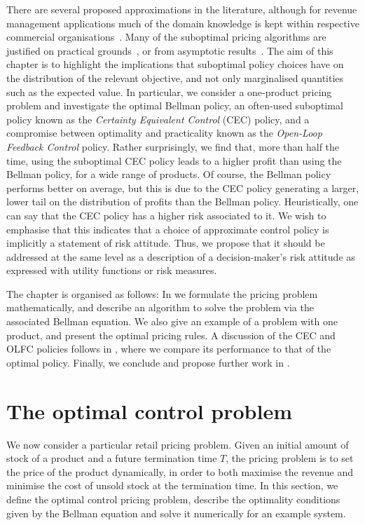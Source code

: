 \documentclass[main.tex]{subfiles}
\begin{document}
There are several proposed approximations in the
literature, although for revenue management applications much of the domain knowledge is kept within
respective commercial organisations~\citep[Ch.~9]{talluri2006theory}.
Many of the suboptimal pricing algorithms are justified on practical
grounds~\citep{aviv2012dynamic}, or
from asymptotic results~\citep{gallego1994optimal}.
The aim of this chapter is to highlight the implications that suboptimal policy
choices have on the distribution of the relevant objective, and not
only marginalised quantities such as the expected value.
In particular, we consider a one-product pricing problem and
investigate the optimal Bellman policy, an often-used suboptimal
policy known as the \emph{Certainty Equivalent Control} (CEC)
policy, and a compromise between optimality and practicality known as the
\emph{Open-Loop Feedback Control} policy.
Rather surprisingly, we find that, more than half the
time, using the suboptimal CEC policy
leads to a higher profit than using the Bellman policy, for a wide
range of products. Of course, the
Bellman policy performs better on average, but
this is due to the CEC policy generating a larger, lower tail on the
distribution of profits than the Bellman policy.
Heuristically, one can say that the CEC policy has a higher risk
associated to it. We wish to emphasise that this indicates that a
choice of approximate control policy is implicitly a statement of
risk attitude. Thus, we propose that it should be addressed at the same level as a
description of a decision-maker's risk attitude as expressed with
utility functions or risk measures.

The chapter is organised as follows:
In  we formulate the
pricing problem mathematically, and describe an algorithm to solve the
problem via the associated Bellman equation. We also give an example
of a problem with one product, and present the optimal pricing rules.
A discussion of the CEC and OLFC policies follows in
, where we compare its
performance to that of
the optimal policy.
Finally, we conclude and propose further work in .


\section{The optimal control problem}\label{sec:bellman_optimal_control}
We now consider a particular retail
pricing problem.
Given an initial amount of stock of a product and a future
termination time $T$,
the pricing problem is to
set the price
of the product dynamically, in order to both maximise the revenue and minimise the cost of
unsold stock at the termination time.
In this section, we define the optimal control pricing problem,
describe the optimality conditions given by the Bellman equation and
solve it numerically for an example system.
\end{document}
